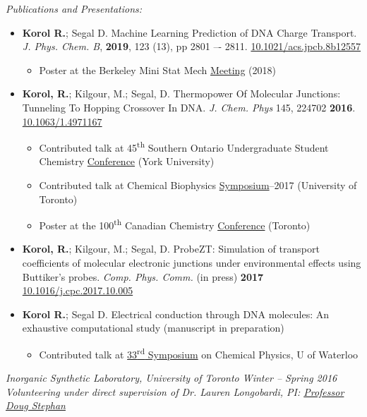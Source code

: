 \documentclass[9pt, margin]{res}
\begin{document}
\begin{resume}
\textit{Publications and Presentations:}
\begin{itemize}
	\item \textbf{Korol R.}; Segal D. Machine Learning Prediction of DNA Charge Transport. \textit{J. Phys. Chem. B}, \textbf{2019}, 123 (13), pp 2801 –- 2811. \href{https://pubs.acs.org/doi/full/10.1021/acs.jpcb.8b12557}{10.1021/acs.jpcb.8b12557}
		\begin{itemize}
			\item Poster at the Berkeley Mini Stat Mech \href{http://berkeleystatmech.org/}{Meeting} (2018)
		\end{itemize}
	\item \textbf{Korol, R.}; Kilgour,  M.; Segal, D. Thermopower Of Molecular Junctions: Tunneling To Hopping Crossover In DNA. \textit{J. Chem. Phys} 145, 224702 \textbf{2016}. \href{http://aip.scitation.org/doi/10.1063/1.4971167}{10.1063/1.4971167}
		\begin{itemize}
			\item Contributed talk at 45\textsuperscript{th} Southern Ontario Undergraduate Student Chemistry \href{http://www.souscc45.ca}{ Conference} (York University)
			\item Contributed talk at Chemical Biophysics \href{www.chembiophys.ca}{Symposium}--2017 (University of Toronto)
			\item Poster at the 100\textsuperscript{th} Canadian Chemistry \href{www.csc2017.ca}{Conference} (Toronto)
		\end{itemize} 
	\item \textbf{Korol, R.}; Kilgour,  M.; Segal, D. ProbeZT: Simulation of transport coefficients of molecular electronic junctions under environmental effects using Buttiker’s probes. \textit{Comp. Phys. Comm.} (in press) \textbf{2017} \href{https://doi.org/10.1016/j.cpc.2017.10.005}{10.1016/j.cpc.2017.10.005}
	\item \textbf{Korol R.}; Segal D. Electrical conduction through DNA molecules: An exhaustive computational study (manuscript in preparation)
	\begin{itemize}
		\item Contributed talk at \href{http://scp.uwaterloo.ca}{33\textsuperscript{rd} Symposium} on Chemical Physics, U of Waterloo
		\newline \newline
	\end{itemize}
\end{itemize}
{\sl Inorganic Synthetic Laboratory, University of Toronto  \hfill Winter -- Spring 2016 \\
Volunteering under direct supervision of Dr. Lauren Longobardi, PI: \href{http://www.chem.utoronto.ca/staff/DSTEPHAN/index.htm}{Professor Doug Stephan}} 


\end{resume}
\end{document}

